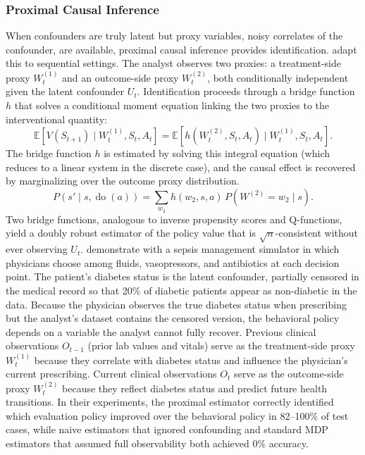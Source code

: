 \subsubsection{Proximal Causal Inference}
\label{subsubsec:proximal}

When confounders are truly latent but proxy variables, noisy correlates of the confounder, are available, proximal causal inference provides identification. \citet{bennett2021proximal} adapt this to sequential settings. The analyst observes two proxies: a treatment-side proxy $W_t^{(1)}$ and an outcome-side proxy $W_t^{(2)}$, both conditionally independent given the latent confounder $U_t$. Identification proceeds through a bridge function $h$ that solves a conditional moment equation linking the two proxies to the interventional quantity:
\begin{equation}
\mathbb{E}[V(S_{t+1}) \mid W_t^{(1)}, S_t, A_t] = \mathbb{E}[h(W_t^{(2)}, S_t, A_t) \mid W_t^{(1)}, S_t, A_t].
\label{eq:bridge}
\end{equation}
The bridge function $h$ is estimated by solving this integral equation (which reduces to a linear system in the discrete case), and the causal effect is recovered by marginalizing over the outcome proxy distribution.
\begin{equation}
P(s' \mid s, \operatorname{do}(a)) = \sum_{w_2} h(w_2, s, a) \, P(W^{(2)}{=}w_2 \mid s).
\label{eq:proximal_adj}
\end{equation}
Two bridge functions, analogous to inverse propensity scores and Q-functions, yield a doubly robust estimator of the policy value that is $\sqrt{n}$-consistent without ever observing $U_t$. \citet{bennett2021proximal} demonstrate with a sepsis management simulator in which physicians choose among fluids, vasopressors, and antibiotics at each decision point. The patient's diabetes status is the latent confounder, partially censored in the medical record so that 20\% of diabetic patients appear as non-diabetic in the data. Because the physician observes the true diabetes status when prescribing but the analyst's dataset contains the censored version, the behavioral policy depends on a variable the analyst cannot fully recover. Previous clinical observations $O_{t-1}$ (prior lab values and vitals) serve as the treatment-side proxy $W_t^{(1)}$ because they correlate with diabetes status and influence the physician's current prescribing. Current clinical observations $O_t$ serve as the outcome-side proxy $W_t^{(2)}$ because they reflect diabetes status and predict future health transitions. In their experiments, the proximal estimator correctly identified which evaluation policy improved over the behavioral policy in 82--100\% of test cases, while naive estimators that ignored confounding and standard MDP estimators that assumed full observability both achieved 0\% accuracy.

